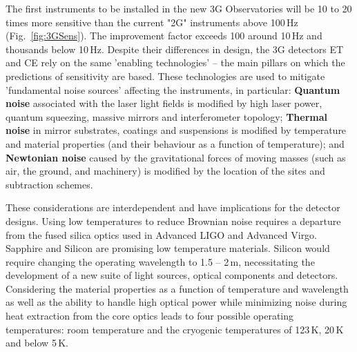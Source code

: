 The first instruments to be installed in the new 3G Observatories will be 10 to 20 times more sensitive than the current 
"2G" instruments above 100\,Hz (Fig.~\ref{fig:3GSens}).  The improvement factor exceeds 100 around 10\,Hz and thousands below 10\,Hz. Despite their differences in design, the 3G detectors ET and CE rely on the same 'enabling technologies' -- the main pillars on which the predictions of sensitivity are based. These technologies are used to mitigate 'fundamental noise sources' affecting the instruments, in particular: \textbf{Quantum noise} associated with the laser light fields is modified by high laser power, quantum squeezing, massive mirrors and interferometer topology; \textbf{Thermal noise} in mirror substrates, coatings and suspensions is modified by temperature and material properties (and their behaviour as a function of temperature); and \textbf{Newtonian noise} caused by the gravitational forces of moving masses (such as air, the ground, and machinery) is modified by the location of the sites and subtraction schemes. 

These considerations are interdependent and have implications for the detector designs. Using low temperatures to reduce Brownian noise requires a departure from the fused silica optics used in Advanced LIGO and Advanced Virgo. Sapphire and Silicon are promising low temperature materials. Silicon would require changing the operating wavelength to 1.5 -- 2\,\micro m, necessitating the development of a new suite of light sources, optical components and detectors. Considering the material properties as a function of temperature and wavelength as well as the ability to handle high optical power while minimizing noise during heat extraction from the core optics leads to four possible operating temperatures:
room temperature and the cryogenic temperatures of 123\,K, 20\,K and below 5\,K.


